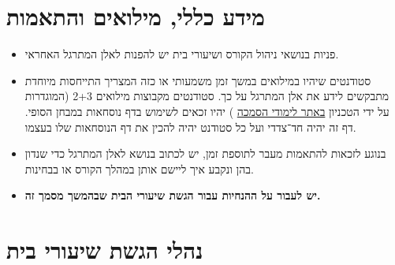 \documentclass{article}
\begin{document}
\section*{מידע כללי, מילואים והתאמות}

\begin{itemize}
\item[-]
פניות בנושאי ניהול הקורס ושיעורי בית יש להפנות לאלן המתרגל האחראי.
\item[-]
סטודנטים שיהיו במילואים במשך זמן משמעותי או כזה המצריך התייחסות מיוחדת מתבקשים לידע את אלן המתרגל על כך. סטודנטים מקבוצות מילואים 2+3 (המוגדרות על ידי הטכניון
\href{https://ugportal.technion.ac.il/\%D7\%9E\%D7\%99\%D7\%93\%D7\%A2-\%D7\%9C\%D7\%A1\%D7\%98\%D7\%95\%D7\%93\%D7\%A0\%D7\%98\%D7\%99\%D7\%9D/\%D7\%9E\%D7\%99\%D7\%9C\%D7\%95\%D7\%90\%D7\%99\%D7\%9D-\%D7\%97\%D7\%93\%D7\%A9/}{באתר לימודי הסמכה}%
)
יהיו זכאים לשימוש בדף נוסחאות במבחן הסופי. דף זה יהיה חד־צדדי ועל כל סטודנט יהיה להכין את דף הנוסחאות שלו בעצמו.
\item[-] בנוגע לזכאות להתאמות מעבר לתוספת זמן, יש לכתוב בנושא לאלן המתרגל כדי שנדון בהן ונקבע איך ליישם אותן במהלך הקורס או בבחינות.
\item[-] \textbf{יש לעבור על ההנחיות עבור הגשת שיעורי הבית שבהמשך מסמך זה.}
\end{itemize}

\section*{נהלי הגשת שיעורי בית}
\end{document}

